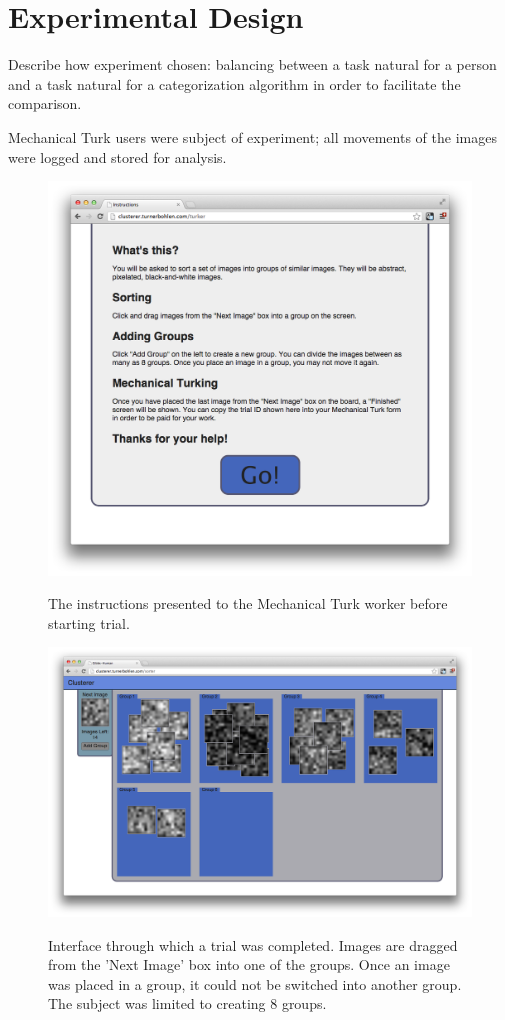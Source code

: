 \section*{Experimental Design}

Describe how experiment chosen: balancing between a task natural for a person
and a task natural for a categorization algorithm in order to facilitate the
comparison.

Mechanical Turk users were subject of experiment; all movements of the images
were logged and stored for analysis.

\begin{figure}
\includegraphics[width=6in]{img/instructions.png}
\label{fig:instructions}
\caption{The instructions presented to the Mechanical Turk worker before
  starting trial.}
\end{figure}

\begin{figure}
\includegraphics[width=6in]{img/clusterer.png}
\label{fig:clusterer}
\caption{Interface through which a trial was completed. Images are dragged from
  the 'Next Image' box into one of the groups. Once an image was placed in a
  group, it could not be switched into another group.  The subject was limited
  to creating 8 groups.}
\end{figure}
